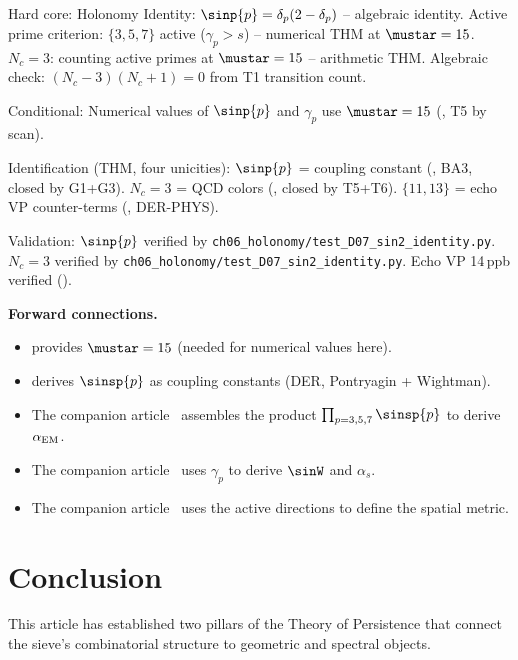 \documentclass[12pt,a4paper]{article}
\begin{document}
\begin{ledgerbox}
Hard core:
  Holonomy Identity: $\sinp{p} = \delta_p(2-\delta_p)$ -- algebraic identity.
  Active prime criterion: $\{3,5,7\}$ active ($\gamma_p > s$) -- numerical THM at $\mustar=15$.
  $N_c = 3$: counting active primes at $\mustar = 15$ -- arithmetic THM.
  Algebraic check: $(N_c-3)(N_c+1)=0$ from T1 transition count.

Conditional:
  Numerical values of $\sinp{p}$ and $\gamma_p$ use $\mustar = 15$ (\cite{companion_M3}, T5 by scan).

Identification (THM, four unicities):
  $\sinp{p}$ = coupling constant (\cite{companion_M5}, BA3, closed by G1+G3).
  $N_c = 3$ = QCD colors (\cite{companion_M5}, closed by T5+T6).
  $\{11,13\}$ = echo VP counter-terms (\cite{companion_physics}, DER-PHYS).

Validation:
  $\sinp{p}$ verified by \texttt{ch06\_holonomy/test\_D07\_sin2\_identity.py}.
  $N_c = 3$ verified by \texttt{ch06\_holonomy/test\_D07\_sin2\_identity.py}.
  Echo VP 14\,ppb verified (\cite{companion_physics}).
\end{ledgerbox}

\medskip\noindent\textbf{Forward connections.}
\begin{itemize}
\item \cite{companion_M3} provides $\mustar = 15$ (needed for numerical values here).
\item \cite{companion_M5} derives $\sinsp{p}$ as coupling constants (DER, Pontryagin + Wightman).
\item The companion article~\cite{companion_physics} assembles the product $\prod_{p=3,5,7} \sinsp{p}$
  to derive $\alpha_{\rm EM}$.
\item The companion article~\cite{companion_physics} uses $\gamma_p$ to derive $\sinW$ and $\alpha_s$.
\item The companion article~\cite{companion_physics} uses the active directions to define the spatial metric.
\end{itemize}


\newpage


\section{Conclusion}
\label{sec:conclusion}

This article has established two pillars of the Theory of Persistence
that connect the sieve's combinatorial structure to geometric and
spectral objects.
\end{document}
